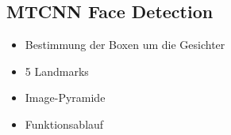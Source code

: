 \subsection{MTCNN Face Detection}
\begin{itemize}
\item Bestimmung der Boxen um die Gesichter
\item 5 Landmarks
\item Image-Pyramide
\item Funktionsablauf
\end{itemize}